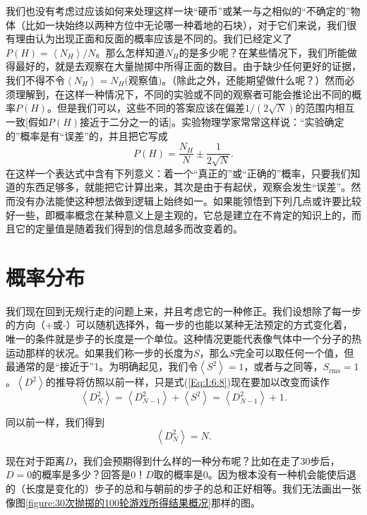 我们也没有考虑过应该如何来处理这样一块“硬币”或某一与之相似的“不确定的”物体（比如一块始终以两种方位中无论哪一种着地的石块），对于它们来说，我们很有理由认为出现正面和反面的概率应该是不同的。我们已经定义了$P(H)=\left < N_H \right >/N$。那么怎样知道$N_H$的是多少呢？在某些情况下，我们所能做得最好的，就是去观察在大量抛掷中所得正面的数目。由于缺少任何更好的证据，我们不得不令$\left < N_H \right > = N_H\textrm{(观察值)}$。（除此之外，还能期望做什么呢？）然而必须理解到，在这样一种情况下，不同的实验或不同的观察者可能会推论出不同的概率$P(H)$。但是我们可以，这些不同的答案应该在偏差$1/(2\sqrt{N})$的范围内相互一致[假如$P(H)$接近于二分之一的话]。实验物理学家常常这样说：“实验确定的”概率是有“误差”的，并且把它写成
\begin{equation}
\label{Eq:I:6:14}
P(H)=\frac{N_H}{N}\pm\frac{1}{2\sqrt{N}}.
\end{equation}
在这样一个表达式中含有下列意义：着一个“真正的”或“正确的”概率，只要我们知道的东西足够多，就能把它计算出来，其次是由于有起伏，观察会发生“误差”。然而没有办法能使这种想法做到逻辑上始终如一。如果能领悟到下列几点或许要比较好一些，即概率概念在某种意义上是主观的，它总是建立在不肯定的知识上的，而且它的定量值是随着我们得到的信息越多而改变着的。


\section{概率分布}

我们现在回到无规行走的问题上来，并且考虑它的一种修正。我们设想除了每一步的方向（+或-）可以随机选择外，每一步的也能以某种无法预定的方式变化着，唯一的条件就是步子的长度是一个单位。这种情况更能代表像气体中一个分子的热运动那样的状况。如果我们称一步的长度为$S$，那么$S$完全可以取任何一个值，但最通常的是“接近于”1。为明确起见，我们令$\left < S^2 \right > = 1$，或者与之同等，$S_{\text{rms}}=1$。$\left < D^2 \right > $的推导将仿照以前一样，只是式(\ref{Eq:I:6:8})现在要加以改变而读作
\begin{equation}
\label{Eq:I:6:15}
\left < D_N^2 \right >=\left <D_{N-1}^2\right >+\left <S^2\right >=\left <D_{N-1}^2\right >+1.
\end{equation}

同以前一样，我们得到
\begin{equation}
\label{Eq:I:6:16}
\left <D_N^2\right > =N.
\end{equation}

现在对于距离$D$，我们会预期得到什么样的一种分布呢？比如在走了30步后，$D=0$的概率是多少？回答是$0$！$D$取的概率是0。因为根本没有一种机会能使后退的（长度是变化的）步子的总和与朝前的步子的总和正好相等。我们无法画出一张像图\ref{figure:30次抛掷的100轮游戏所得结果概况}那样的图。

